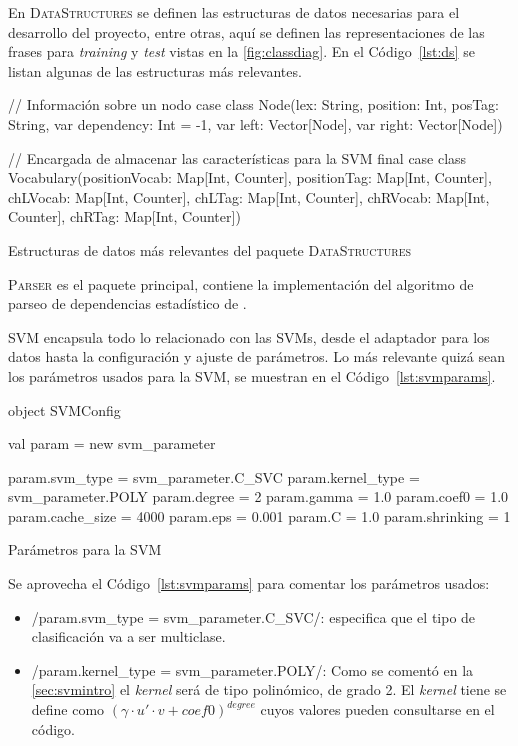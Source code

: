 En \textsc{DataStructures} se definen las estructuras de datos necesarias para
el desarrollo del proyecto, entre otras, aquí se definen las representaciones de
las frases para \emph{training} y \emph{test} vistas en la
\autoref{fig:classdiag}. En el Código~\ref{lst:ds} se listan algunas de las
estructuras más relevantes.
\begin{listing}[ht]
  \begin{scalacode}
    // Información sobre un nodo
    case class Node(lex: String,
                    position: Int,
                    posTag: String,
                    var dependency: Int = -1,
                    var left: Vector[Node],
                    var right: Vector[Node])

    // Encargada de almacenar las características para la SVM
    final case class Vocabulary(positionVocab: Map[Int, Counter],
                                positionTag: Map[Int, Counter],
                                chLVocab: Map[Int, Counter],
                                chLTag: Map[Int, Counter],
                                chRVocab: Map[Int, Counter],
                                chRTag: Map[Int, Counter])
  \end{scalacode}
  \caption{\footnotesize Estructuras de datos más relevantes del paquete
    \textsc{DataStructures}}
  \label{lst:ds}
\end{listing}

\textsc{Parser} es el paquete principal, contiene la implementación del
algoritmo de parseo de dependencias estadístico de \citeauthor{yamada2003}.

\textsc{SVM} encapsula todo lo relacionado con las \acp{SVM}, desde el adaptador
para los datos hasta la configuración y ajuste de parámetros. Lo más relevante
quizá sean los parámetros usados para la \ac{SVM}, se muestran en el
Código~\ref{lst:svmparams}.
\begin{listing}[ht]
  \begin{scalacode}
    object SVMConfig {
      val param = new svm_parameter

      param.svm_type = svm_parameter.C_SVC
      param.kernel_type = svm_parameter.POLY
      param.degree = 2
      param.gamma = 1.0
      param.coef0 = 1.0
      param.cache_size = 4000
      param.eps = 0.001
      param.C = 1.0
      param.shrinking = 1
    }
  \end{scalacode}
  \caption{Parámetros para la \ac{SVM}}
  \label{lst:svmparams}
\end{listing}
Se aprovecha el Código~\ref{lst:svmparams} para comentar los parámetros usados:
\begin{itemize}
\item \scalainline/param.svm_type = svm_parameter.C_SVC/: especifica que el tipo
  de clasificación va a ser multiclase.
\item \scalainline/param.kernel_type = svm_parameter.POLY/: Como se comentó en
  la \autoref{sec:svmintro} el \emph{kernel} será de tipo polinómico, de grado
  2. El \emph{kernel} tiene se define como
  $(\gamma\cdot u'\cdot v + coef0)^{degree}$ cuyos valores pueden consultarse en
  el código.
\end{itemize}

